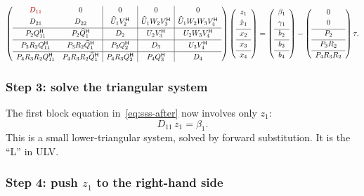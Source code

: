 \documentclass[11pt]{article}
\newcommand{\ct}{^{\mathsf H}}            %
\newcommand{\hU}{\widehat U}
\newcommand{\hQ}{\widehat Q}
\newcommand{\hx}{\hat x}
\theoremstyle{definition}
\begin{document}
\begin{equation}
\label{eq:sss-after}
\left(\begin{array}{cc|c|c|c}
\color{red!70!black}D_{11} & 0 & 0 & 0 & 0\\[2pt]
D_{21} & D_{22} & \hU_1V_2\ct & \hU_1W_2V_3\ct & \hU_1W_2W_3V_4\ct\\[2pt]\hline
P_2Q_{11}\ct & P_2\hQ_1\ct & D_2 & U_2V_3\ct & U_2W_3V_4\ct\\[2pt]\hline
P_3R_2Q_{11}\ct & P_3R_2\hQ_1\ct & P_3Q_2\ct & D_3 & U_3V_4\ct\\[2pt]\hline
P_4R_3R_2Q_{11}\ct & P_4R_3R_2\hQ_1\ct & P_4R_3Q_2\ct & P_4Q_3\ct & D_4
\end{array}\right)
\left(\begin{array}{c} z_1\\[2pt] \hx_1\\[2pt]\hline x_2\\[2pt]\hline x_3\\[2pt]\hline x_4\end{array}\right)
=
\left(\begin{array}{c} \beta_1\\[2pt] \gamma_1\\[2pt]\hline b_2\\[2pt]\hline b_3\\[2pt]\hline b_4\end{array}\right)
-
\left(\begin{array}{c} 0\\[2pt] 0\\[2pt]\hline P_2\\[2pt]\hline P_3R_2\\[2pt]\hline P_4R_3R_2\end{array}\right)\tau .
\end{equation}

\subsubsection*{Step 3: solve the triangular system}

The first block equation in~\eqref{eq:sss-after} now involves only $z_1$:
\[
D_{11}\,z_1 = \beta_1 .
\]
This is a small lower-triangular system, solved by forward substitution. It is
the ``L'' in ULV.

\subsubsection*{\texorpdfstring{Step 4: push $z_1$ to the right-hand side}{Step 4: push z1 to the right-hand side}}
\end{document}
